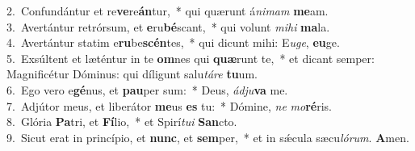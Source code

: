 {2.~}Confundántur et re\textbf{ve}re\textbf{án}tur,~* qui quærunt á\textit{ni}\textit{mam} \textbf{me}am.\\
{3.~}Avertántur retrórsum, et \textbf{e}ru\textbf{bé}scant,~* qui volunt \textit{mi}\textit{hi} \textbf{ma}la.\\
{4.~}Avertántur statim e\textbf{ru}be\textbf{scén}tes,~* qui dicunt mihi: E\textit{u}\textit{ge}, \textbf{e}\textbf{u}ge.\\
{5.~}Exsúltent et læténtur in te \textbf{om}nes qui \textbf{quæ}runt te,~* et dicant semper: Magnificétur Dóminus: qui díligunt salu\textit{tá}\textit{re} \textbf{tu}um.\\
{6.~}Ego vero e\textbf{gé}nus, et \textbf{pau}per sum:~* Deus, \textit{ád}\textit{ju}\textbf{va} me.\\
{7.~}Adjútor meus, et liberátor \textbf{me}us \textbf{es} tu:~* Dómine, \textit{ne} \textit{mo}\textbf{ré}ris.\\
{8.~}Glória \textbf{Pa}tri, et \textbf{Fí}lio,~* et Spirí\textit{tu}\textit{i} \textbf{San}cto.\\
{9.~}Sicut erat in princípio, et \textbf{nunc}, et \textbf{sem}per,~* et in sǽcula sæcu\textit{ló}\textit{rum}. \textbf{A}men.\\
